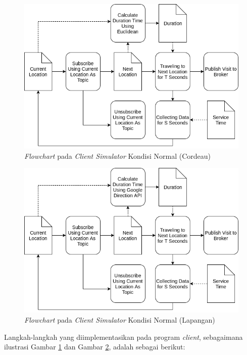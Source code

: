 \begin{figure}[!]
    \centering
    \includegraphics[width=\textwidth]{../../Resources/Images/client-algorithm-nornal-cordeau}
    \caption{\textit{Flowchart} pada \textit{Client Simulator} Kondisi Normal (Cordeau)}
    \label{fig:client-algorithm-nornal-cordeau}
\end{figure}


\begin{figure}[!]
    \centering
    \includegraphics[width=\textwidth]{../../Resources/Images/client-algorithm-nornal-field}
    \caption{\textit{Flowchart} pada \textit{Client Simulator} Kondisi Normal (Lapangan)}
    \label{fig:client-algorithm-nornal-field}
\end{figure}


Langkah-langkah yang diimplementasikan pada program \textit{client}, sebagaimana ilustrasi Gambar \ref{fig:client-algorithm-nornal-cordeau} dan Gambar \ref{fig:client-algorithm-nornal-field}, adalah sebagai berikut:

